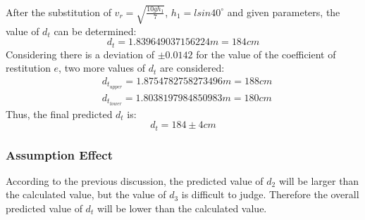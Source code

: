 \documentclass[conference]{IEEEtran}
\begin{document}
            After the substitution of  $v_r = \sqrt{\frac{10gh_1}{7}}$, $h_1 = lsin40^\circ$ and given parameters, the value of $d_t$ can be determined:
            $$d_t = 1.839649037156224m = 184cm$$  
            Considering there is a deviation of $\pm 0.0142$ for the value of the coefficient of restitution $e$, two more values of $d_t$ are considered:
            \begin{align}
                &d_{t_{upper}} = 1.8754782758273496m = 188cm \nonumber\\
                &d_{t_{lower}} = 1.8038197984850983m = 180cm \nonumber
            \end{align}
            Thus, the final predicted $d_t$ is:
            \begin{equation}
                d_t = 184 \pm 4cm \label{ans:1}
            \end{equation}
    \subsubsection{Assumption Effect}
    According to the previous discussion, the predicted value of $d_2$ will be larger than the calculated value, but the value of $d_3$ is difficult to judge. Therefore the overall predicted value of $d_t$ will be lower than the calculated value.
\end{document}

